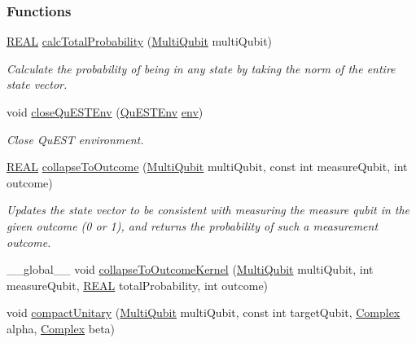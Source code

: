 \subsubsection*{Functions}
\begin{DoxyCompactItemize}
\item 
\mbox{\hyperlink{QuEST__precision_8h_a4b654506f18b8bfd61ad2a29a7e38c25}{R\+E\+AL}} \mbox{\hyperlink{QuEST__env__localGPU_8cu_a818a4c7cd7252d2b10b896b12fa431d3}{calc\+Total\+Probability}} (\mbox{\hyperlink{structMultiQubit}{Multi\+Qubit}} multi\+Qubit)
\begin{DoxyCompactList}\small\item\em Calculate the probability of being in any state by taking the norm of the entire state vector. \end{DoxyCompactList}\item 
void \mbox{\hyperlink{QuEST__env__localGPU_8cu_abd4bc926cd3f9b65610bb228d0c59fe0}{close\+Qu\+E\+S\+T\+Env}} (\mbox{\hyperlink{structQuESTEnv}{Qu\+E\+S\+T\+Env}} \mbox{\hyperlink{runTests_8c_a5fd8ba97fcae3408ae6221dfc3cc1f93}{env}})
\begin{DoxyCompactList}\small\item\em Close Qu\+E\+ST environment. \end{DoxyCompactList}\item 
\mbox{\hyperlink{QuEST__precision_8h_a4b654506f18b8bfd61ad2a29a7e38c25}{R\+E\+AL}} \mbox{\hyperlink{QuEST__env__localGPU_8cu_a07418ebac70fd9ae5d051d089961631d}{collapse\+To\+Outcome}} (\mbox{\hyperlink{structMultiQubit}{Multi\+Qubit}} multi\+Qubit, const int measure\+Qubit, int outcome)
\begin{DoxyCompactList}\small\item\em Updates the state vector to be consistent with measuring the measure qubit in the given outcome (0 or 1), and returns the probability of such a measurement outcome. \end{DoxyCompactList}\item 
\+\_\+\+\_\+global\+\_\+\+\_\+ void \mbox{\hyperlink{QuEST__env__localGPU_8cu_ab9c5c19b3bd2ac5d1ac4506fa21c1c84}{collapse\+To\+Outcome\+Kernel}} (\mbox{\hyperlink{structMultiQubit}{Multi\+Qubit}} multi\+Qubit, int measure\+Qubit, \mbox{\hyperlink{QuEST__precision_8h_a4b654506f18b8bfd61ad2a29a7e38c25}{R\+E\+AL}} total\+Probability, int outcome)
\item 
void \mbox{\hyperlink{QuEST__env__localGPU_8cu_a03b13dfcabd8c59b50dbdd3af44ba8b2}{compact\+Unitary}} (\mbox{\hyperlink{structMultiQubit}{Multi\+Qubit}} multi\+Qubit, const int target\+Qubit, \mbox{\hyperlink{structComplex}{Complex}} alpha, \mbox{\hyperlink{structComplex}{Complex}} beta)

\end{DoxyCompactItemize}

